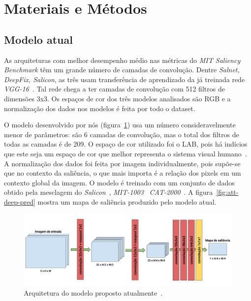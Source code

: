 \documentclass[11pt]{article}
\newcommand{\tit}[1]{\textit{#1}}
\begin{document}
\section{Materiais e Métodos}
\subsection{Modelo atual}
As arquiteturas com melhor desempenho médio nas métricas do
\tit{MIT Saliency Benchmark} têm um grande número de camadas de convolução.
Dentre \tit{Salnet, DeepFix, Salicon}, as três usam transferência de
aprendizado da já treinada rede \tit{VGG-16}~\cite{ref:vgg-16}.
Tal rede chega a ter camadas de convolução com 512 filtros de dimensões 3x3.
Os espaços de cor dos três modelos analisados são RGB e a normalização dos
dados nos modelos é feita por todo o dataset.

O modelo desenvolvido por nós (figura~\ref{fig:att-deep-model})
usa um número consideravelmente menor de
parâmetros: são 6 camadas de convolução, mas o total dos filtros de todas
as camadas é de 209. O espaço de cor utilizado foi o LAB, pois há indícios
que este seja um espaço de cor que melhor representa o sistema
visual humano~\cite{ref:vocus}.
A normalização dos dados foi feita por imagem
individualmente, pois supõe-se que no contexto da saliência, o que mais
importa é a relação dos pixels em um contexto global da imagem.
O modelo é treinado com um conjunto de dados obtido pela mesclagem do
\tit{Salicon}~\cite{ref:salicon-dataset},
\tit{MIT-1003}~\cite{ref:judd-1003-dataset}
\tit{CAT-2000}~\cite{ref:cat-2000-dataset}.
A figura~\ref{fig:att-deep-pred} mostra um mapa de saliência produzido
pelo modelo atual.

\begin{figure}[H]
    \hspace*{-0.5in}
    \includegraphics[width=1.2\linewidth]{imgs/att_deep.png}
    \caption{Arquitetura do modelo proposto atualmente~\cite{ref:att-deep}.}
    \label{fig:att-deep-model}
\end{figure}
\end{document}

